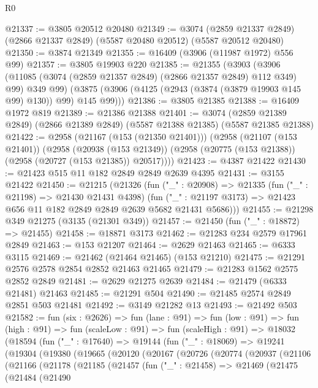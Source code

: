 \begin{lexlean}{R0}
\begin{coremodule}
@21337 := @3805 @20512 @20480
@21349 := @3074
    (@2859 @21337 @2849)
    (@2866 @21337 @2849)
    (@5587 @20480 @20512)
    (@5587 @20512 @20480)
@21350 := @3874 @21349
@21355 := @16409 (@3906 (@11987 @1972) @556 @99)
@21357 := @3805 @19903 @220
@21385 := @21355
    (@3903
      (@3906 (@11085 (@3074 (@2859 @21357 @2849) (@2866 @21357 @2849) @112 @349) @99) @349 @99)
      (@3875 (@3906 (@4125 (@2943 (@3874 (@3879 @19903 @145 @99) @130)) @99) @145 @99)))
@21386 := @3805 @21385
@21388 := @16409 @1972 @819
@21389 := @21386 @21388
@21401 := @3074
    (@2859 @21389 @2849)
    (@2866 @21389 @2849)
    (@5587 @21388 @21385)
    (@5587 @21385 @21388)
@21422 := @2958
    (@21167 (@153 (@21350 @21401)))
    (@2958
      (@21107 (@153 @21401))
      (@2958
        (@20938 (@153 @21349))
        (@2958 (@20775 (@153 @21388)) (@2958 (@20727 (@153 @21385)) @20517))))
@21423 := @4387 @21422
@21430 := @21423 @515 @11 @182 @2849 @2849 @2639 @4395
@21431 := @3155 @21422
@21450 := @21215
    (@21326
      (fun ("_" : @20908) =>
      @21335
        (fun ("_" : @21198) => @21430 @21431 @4398)
        (fun ("_" : @21197 @3173) => @21423 @656 @11 @182 @2849 @2849 @2639 @5682 @21431 @5686)))
@21455 := @21298 @349 @21275 (@3135 (@21301 @349))
@21457 := @21450 (fun ("_" : @18872) => @21455)
@21458 := @18871 @3173
@21462 := @21283 @234 @2579 @17961 @2849
@21463 := @153 @21207
@21464 := @2629 @21463
@21465 := @6333 @3115
@21469 := @21462 (@21464 @21465) (@153 @21210)
@21475 := @21291 @2576 @2578 @2854 @2852 @21463 @21465
@21479 := @21283 @1562 @2575 @2852 @2849
@21481 := @2629 @21275 @2639
@21484 := @21479 (@6333 @21481) @21463
@21485 := @21291 @504
@21490 := @21485 @2574 @2849 @2851 @503 @21481
@21492 := @3149 @21282 @13
@21493 := @21492 @503
@21582 := fun (six : @2626) =>
  fun (lane : @91) =>
  fun (low : @91) =>
  fun (high : @91) =>
  fun (scaleLow : @91) =>
  fun (scaleHigh : @91) =>
  @18032
    (@18594
      (fun ("_" : @17640) =>
      @19144
        (fun ("_" : @18069) =>
        @19241
          (@19304
            (@19380
              (@19665
                (@20120
                  (@20167
                    (@20726
                      (@20774
                        (@20937
                          (@21106
                            (@21166
                              (@21178
                                (@21185
                                  (@21457
                                    (fun ("_" : @21458) =>
                                    @21469
                                      (@21475
                                        (@21484
                                          (@21490

\end{coremodule}
\end{lexlean}
